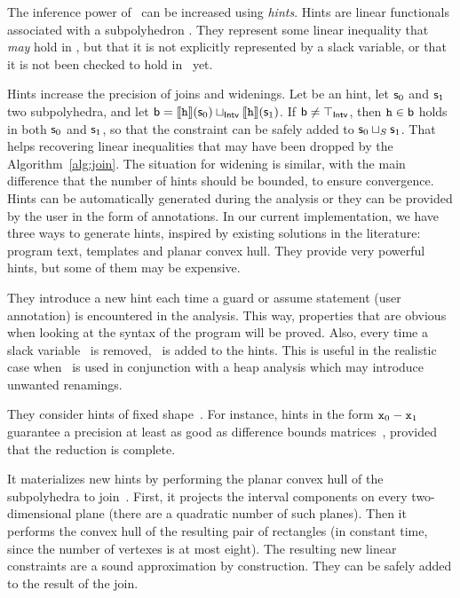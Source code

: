 \documentclass{llncs}
\begin{document}

The inference power of \Subpoly\ can be increased  using \emph{hints}.
Hints are linear functionals associated with a subpolyhedron \subpoly.
They represent some linear inequality that \emph{may} hold in \subpoly, but that it is not explicitly represented by a slack variable, or that it is not been checked to hold in \subpoly\ yet. 

Hints increase the precision of joins and widenings.
Let  be an hint, let $\mathsf{\mathsf{s}}_0$ and $\mathsf{\mathsf{s}}_1$ two subpolyhedra, and let $\mathsf{\mathsf{b}} = \mathbb{}\llbracket \mathtt{h} \rrbracket(\mathsf{\mathsf{s}}_0) \sqcup_{\mathsf{Intv}} \mathbb{}\llbracket \mathtt{h} \rrbracket(\mathsf{\mathsf{s}}_1)$. 
If $\mathsf{\mathsf{b}} \neq \top_{\mathsf{Intv}}$, then $\mathtt{h} \in \mathsf{\mathsf{b}}$ holds in both $\mathsf{\mathsf{s}}_0$ and $\mathsf{\mathsf{s}}_1$, so that the constraint can be safely added to $\mathsf{\mathsf{s}}_0 \sqcup_{S} \mathsf{\mathsf{s}}_1$.
That helps recovering linear inequalities that may have been dropped by the Algorithm~\ref{alg:join}.
The situation for widening is similar, with the main difference that the number of hints should be bounded, to ensure convergence.
Hints can be automatically generated during the analysis or they can be provided by the user in the form of annotations.
In our current implementation, we have three ways to generate hints, inspired by existing solutions in the literature: program text, templates and planar convex hull.
They provide very powerful hints, but some of them may be expensive. 

 They introduce a new hint each time a guard or assume statement (user annotation) is encountered in the analysis. 
This way, properties that are obvious when looking at the syntax of the program will be proved.
Also, every time a slack variable \slackvar\ is removed,  \slackvarinfo\ is added to the hints. 
This is useful in the realistic case when \Subpoly\ is used in conjunction with a heap analysis which may introduce unwanted renamings.

 They consider hints of fixed shape~\cite{Sankaranarayanan05}. 
For instance, hints in the form $\mathtt{x}_0 - \mathtt{x}_1$ guarantee a precision at least as good as difference bounds matrices~\cite{Mine01-2}, provided that the reduction is complete.

 It materializes new hints by performing the planar convex hull of the subpolyhedra to join~\cite{SimonKing02-2}.
First, it projects the interval components on every two-dimensional plane (there are a quadratic number of such planes).
Then it performs the convex hull of the resulting pair of rectangles (in constant time, since the number of vertexes is at most eight). 
The resulting new linear constraints are a sound approximation by construction.
They can be safely added to the result of the join.
\end{document}
